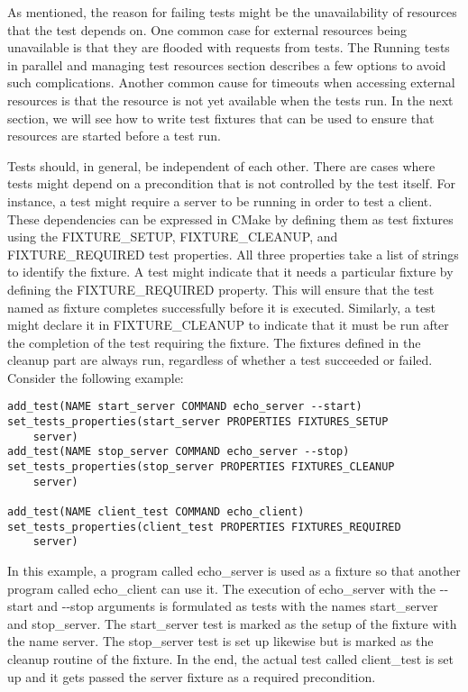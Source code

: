 As mentioned, the reason for failing tests might be the unavailability of resources that the test depends on. One common case for external resources being unavailable is that they are flooded with requests from tests. The Running tests in parallel and managing test resources section describes a few options to avoid such complications. Another common cause for timeouts when accessing external resources is that the resource is not yet available when the tests run. In the next section, we will see how to write test fixtures that can be used to ensure that resources are started before a test run.


Tests should, in general, be independent of each other. There are cases where tests might depend on a precondition that is not controlled by the test itself. For instance, a test might require a server to be running in order to test a client. These dependencies can be expressed in CMake by defining them as test fixtures using the FIXTURE\_SETUP, FIXTURE\_CLEANUP, and FIXTURE\_REQUIRED test properties. All three properties take a list of strings to identify the fixture. A test might indicate that it needs a particular fixture by defining the FIXTURE\_REQUIRED property. This will ensure that the test named as fixture completes successfully before it is executed. Similarly, a test might declare it in FIXTURE\_CLEANUP to indicate that it must be run after the completion of the test requiring the fixture. The fixtures defined in the cleanup part are always run, regardless of whether a test succeeded or failed. Consider the following example:

\begin{lstlisting}[style=styleCMake]
add_test(NAME start_server COMMAND echo_server --start)
set_tests_properties(start_server PROPERTIES FIXTURES_SETUP
	server)
add_test(NAME stop_server COMMAND echo_server --stop)
set_tests_properties(stop_server PROPERTIES FIXTURES_CLEANUP
	server)

add_test(NAME client_test COMMAND echo_client)
set_tests_properties(client_test PROPERTIES FIXTURES_REQUIRED
	server)
\end{lstlisting}

In this example, a program called echo\_server is used as a fixture so that another program called echo\_client can use it. The execution of echo\_server with the -{}-start and -{}-stop arguments is formulated as tests with the names start\_server and stop\_server. The start\_server test is marked as the setup of the fixture with the name server. The stop\_server test is set up likewise but is marked as the cleanup routine of the fixture. In the end, the actual test called client\_test is set up and it gets passed the server fixture as a required precondition.


